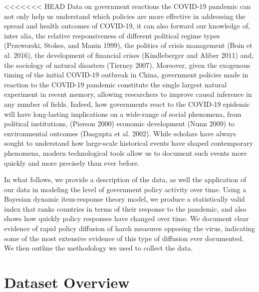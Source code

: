 \documentclass[]{article}
\begin{document}
<<<<<<< HEAD
Data on government reactions the COVID-19 pandemic can not only help us understand which policies are more effective in addressing the spread and health outcomes of COVID-19, it can also forward our knowledge of, inter alia, the relative responsiveness of different political regime types (Przeworski, Stokes, and Manin 1999), the politics of crisis management (Boin et al. 2016), the development of financial crises (Kindleberger and Aliber 2011) and, the sociology of natural disasters (Tierney 2007). Moreover, given the exogenous timing of the initial COVID-19 outbreak in China, government policies made in reaction to the COVID-19 pandemic constitute the single largest natural experiment in recent memory, allowing researchers to improve causal inference in any number of fields. Indeed, how governments react to the COVID-19 epidemic will have long-lasting implications on a wide-range of social phenomena, from political institutions, (Pierson 2000) economic development (Nunn 2009) to environmental outcomes (Dasgupta et al. 2002). While scholars have always sought to understand how large-scale historical events have shaped contemporary phenomena, modern technological tools allow us to document such events more quickly and more precisely than ever before.

In what follows, we provide a description of the data, as well the application of our data in modeling the level of government policy activity over time. Using a Bayesian dynamic item-response theory model, we produce a statistically valid index that ranks countries in terms of their response to the pandemic, and also shows how quickly policy responses have changed over time. We document clear evidence of rapid policy diffusion of harsh measures opposing the virus, indicating some of the most extensive evidence of this type of diffusion ever documented. We then outline the methodology we used to collect the data.

\hypertarget{dataset-overview}{%
\section{Dataset Overview}\label{dataset-overview}}
\end{document}
